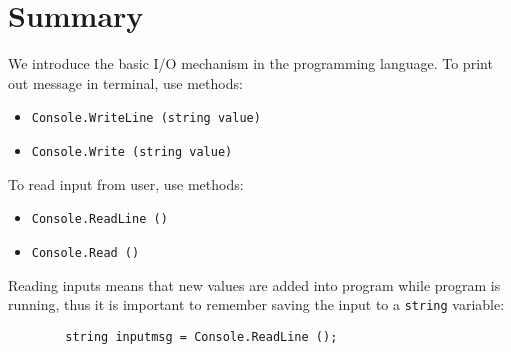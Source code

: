 \documentclass[../main.tex]{subfiles}
\begin{document}
    \section{Summary}
    We introduce the basic I/O mechanism in the \csharp programming language.
    To print out message in terminal, use methods:
    \begin{itemize}
        \item \texttt{Console.WriteLine (string value)}
        \item \texttt{Console.Write (string value)}
    \end{itemize}

    \par To read input from user, use methods:
    \begin{itemize}
        \item \texttt{Console.ReadLine ()}
        \item \texttt{Console.Read ()}
    \end{itemize}
    Reading inputs means that new values are added into program while program is
    running, thus it is important to remember saving the input to a \texttt{string}
    variable:
    \begin{verbatim}
        string inputmsg = Console.ReadLine ();
    \end{verbatim}
\end{document}
